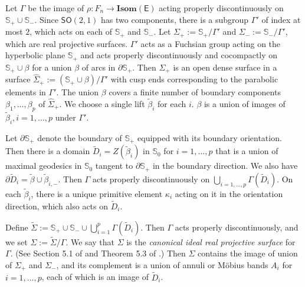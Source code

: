 \documentclass{amsart}
\numberwithin{equation}{section}
\newcommand\ra{\rightarrow}
\newcommand\Isom{{\mathbf{Isom}}}
\newcommand\SO{{\mathsf{SO}}}
\newcommand\Ss{{\mathbb{S}}}
\newcommand\Lspace{\mathsf E}
\theoremstyle{definition}
\theoremstyle{remark}
\begin{document}
Let $\Gamma$ be the image of $\rho:F_n \ra \Isom(\Lspace)$ acting properly discontinuously
on $\Ss_+\cup \Ss_-$. 
Since $\SO(2,1)$ has two components, there is 
a subgroup $\Gamma'$  of index at most $2$, which 
acts on each of $\Ss_+$ and $\Ss_-$. 
Let $\Sigma_+ := \Ss_+/\Gamma'$ and $\Sigma_- := \Ss_-/\Gamma'$,
which are real projective surfaces. 
$\Gamma'$ acts as a Fuchsian group acting on the hyperbolic plane 
$\Ss_+$ and 
acts properly discontinuously and cocompactly 
on $\Ss_+ \cup \beta$ for a union $\beta$ of arcs in $\partial \Ss_+$. 
Then $\Sigma_+$ is an open dense surface in a surface 
$\hat \Sigma_+:= (\Ss_+\cup \beta)/\Gamma'$ with cusp ends corresponding 
to the parabolic elements in $\Gamma'$. 
The union $\beta$ covers a finite number of boundary components $\beta_1, \dots, \beta_p$ of $\hat \Sigma_+$. 
We choose a single lift $\tilde \beta_i$ for each $i$. 
$\beta$ is a union of images of $\tilde \beta_i, i=1, \dots, p$ under $\Gamma'$. 

Let $\partial \Ss_+$ denote the boundary of $\Ss_+$ 
equipped with its boundary orientation.
Then there is a domain $\tilde D_i= Z(\tilde \beta_i)$ in $\Ss_0$ for $i=1, \dots, p$ that is a union of 
maximal geodesics in $\Ss_0$ tangent to $\partial \Ss_+$ in the boundary direction. 
We also have 
$\partial \tilde D_i = \tilde \beta \cup \tilde \beta_{i, -}$. 
Then $\Gamma$ acts properly discontinuously on 
$\bigcup_{i=1,\dots, p}\Gamma(\tilde D_i)$. 
On each $\tilde \beta_i$, there is a unique primitive element $\kappa_i$
acting on it in the orientation direction, 
which also acts on $\tilde D_i$. 

Define $\tilde \Sigma := \Ss_+ \cup \Ss_- \cup \bigcup_{i=1}^p \Gamma({\tilde D_i})$.
Then $\Gamma$ acts properly discontinuously, 
and we set $\Sigma := \tilde \Sigma/\Gamma$.  
We say that $\Sigma$ is the {\em canonical ideal real projective surface} for $\Gamma$. 
(See Section 5.1 of \cite{CDG22} and Theorem 5.3 of \cite{CG17}.)
Then $\Sigma$ contains the image of union of 
$\Sigma_+$ and $\Sigma_-$, and its complement is 
a union of annuli or M\"obius bands $A_i$ for $i=1, \dots, p$, each of 
which is an image of ${\tilde D_i}$.
\end{document}
